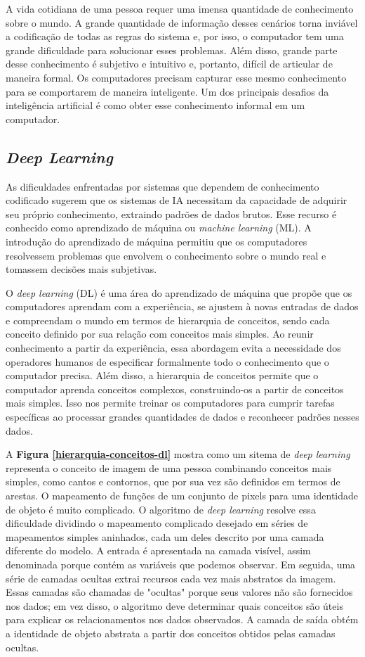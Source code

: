 A vida cotidiana de uma pessoa requer uma imensa quantidade de conhecimento sobre o mundo. A grande quantidade de informação desses cenários torna inviável a codificação de todas as regras do sistema e, por isso, o computador tem uma grande dificuldade para solucionar esses problemas. Além disso, grande parte desse conhecimento é subjetivo e intuitivo e, portanto, difícil de articular de maneira formal. Os computadores precisam capturar esse mesmo conhecimento para se comportarem de maneira inteligente. Um dos principais desafios da inteligência artificial é como obter esse conhecimento informal em um computador.

\subsection{\textit{Deep Learning}}

 As dificuldades enfrentadas por sistemas que dependem de conhecimento codificado sugerem que os sistemas de IA necessitam da capacidade de adquirir seu próprio conhecimento, extraindo padrões de dados brutos. Esse recurso é conhecido como aprendizado de máquina ou \textit{machine learning} (ML). A introdução do aprendizado de máquina permitiu que os computadores resolvessem problemas que envolvem o conhecimento sobre o mundo real e tomassem decisões mais subjetivas.

 O \textit{deep learning} (DL) é uma área do aprendizado de máquina que propõe que os computadores aprendam com a experiência, se ajustem à novas entradas de dados e compreendam o mundo em termos de hierarquia de conceitos, sendo cada conceito definido por sua relação com conceitos mais simples. 
 Ao reunir conhecimento a partir da experiência, essa abordagem evita a necessidade dos operadores humanos de especificar formalmente todo o conhecimento que o computador precisa. Além disso, a hierarquia de conceitos permite que o computador aprenda conceitos complexos, construindo-os a partir de conceitos mais simples. Isso nos permite treinar os computadores para cumprir tarefas específicas ao processar grandes quantidades de dados e reconhecer padrões nesses dados.

 A \textbf{Figura \ref{hierarquia-conceitos-dl}} mostra como um sitema de \textit{deep learning} representa o conceito de imagem de uma pessoa combinando conceitos mais simples, como cantos e contornos, que por sua vez são definidos em termos de arestas. 
 O mapeamento de funções de um conjunto de pixels para uma identidade de objeto é muito complicado. O algoritmo de \textit{deep learning} resolve essa dificuldade dividindo o mapeamento complicado desejado em séries de mapeamentos simples aninhados, cada um deles descrito por uma camada diferente do modelo. A entrada é apresentada na camada visível, assim denominada porque contém as variáveis que podemos observar.
 Em seguida, uma série de camadas ocultas extrai recursos cada vez mais abstratos da imagem. Essas camadas são chamadas de "ocultas" porque seus valores não são fornecidos nos dados; em vez disso, o algoritmo deve determinar quais conceitos são úteis para explicar os relacionamentos nos dados observados. A camada de saída obtém a identidade de objeto abstrata a partir dos conceitos obtidos pelas camadas ocultas.


